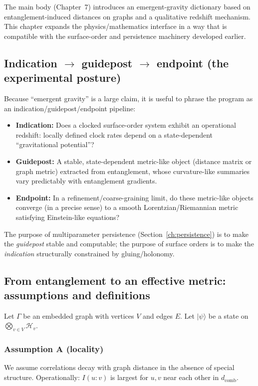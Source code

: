 \documentclass[11pt,oneside]{amsbook}
\numberwithin{equation}{section}
\theoremstyle{plain}
\theoremstyle{definition}
\theoremstyle{remark}
\newcommand{\cH}{\mathcal{H}}
\begin{document}
The  main body (Chapter~7) introduces an emergent-gravity dictionary based on entanglement-induced distances on graphs and a qualitative redshift mechanism.
This chapter expands the physics/mathematics interface in a way that is compatible with the surface-order and persistence machinery developed earlier.

\subsection{Indication $\rightarrow$ guidepost $\rightarrow$ endpoint (the experimental posture)}
\label{sec:ibe}

Because ``emergent gravity'' is a large claim, it is useful to phrase the program as an indication/guidepost/endpoint pipeline:

\begin{itemize}
\item \textbf{Indication:} Does a clocked surface-order system exhibit an operational redshift: locally defined clock rates depend on a state-dependent ``gravitational potential''?
\item \textbf{Guidepost:} A stable, state-dependent metric-like object (distance matrix or graph metric) extracted from entanglement, whose curvature-like summaries vary predictably with entanglement gradients.
\item \textbf{Endpoint:} In a refinement/coarse-graining limit, do these metric-like objects converge (in a precise sense) to a smooth Lorentzian/Riemannian metric satisfying Einstein-like equations?
\end{itemize}

The purpose of multiparameter persistence (Section~\ref{ch:persistence}) is to make the \emph{guidepost} stable and computable; the purpose of surface orders is to make the \emph{indication} structurally constrained by gluing/holonomy.

\subsection{From entanglement to an effective metric: assumptions and definitions}
\label{sec:ent_to_metric}

Let $\Gamma$ be an embedded graph with vertices $V$ and edges $E$.
Let $|\psi\rangle$ be a state on $\bigotimes_{v\in V}\cH_v$.

\subsubsection{Assumption A (locality)}
We assume correlations decay with graph distance in the absence of special structure.
Operationally: $I(u\!:\!v)$ is largest for $u,v$ near each other in $d_{\mathrm{comb}}$.
\end{document}
